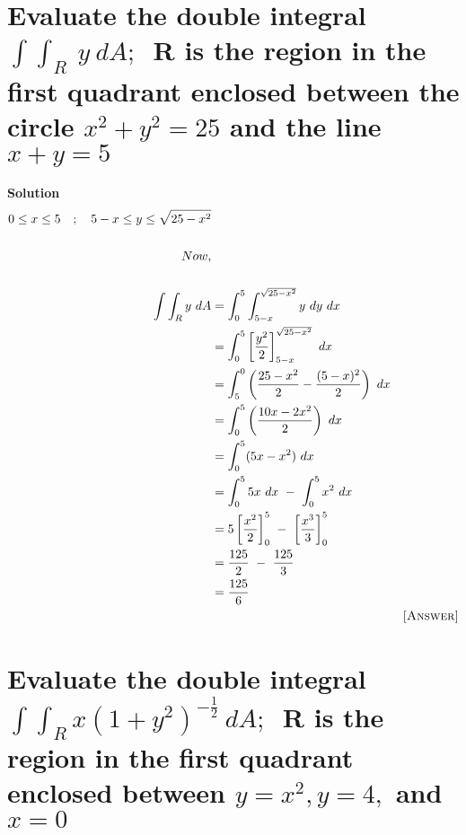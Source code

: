 \documentclass[12pt]{article}
\begin{document}
\section{Evaluate the double integral $\int\int_{R}\ y\ dA;$\ R is the region in the first quadrant enclosed between the circle $x^2+y^2=25$ and the line $x+y=5$}




\textbf{Solution}
\begin{align*}
    0\leq x\leq5\quad ;\quad 5-x\leq y\leq\sqrt{25-x^2}\\\\
    Now,\\\\
    \int\int_{R}y\ dA &=\int_{0}^{5}\int_{5-x}^{\sqrt{25-x^2}}y\ dy\ dx\\
    &=\int_{0}^{5}\left[\frac{y^2}{2}\right]_{5-x}^{\sqrt{25-x^2}}\ dx\\
    &=\int_{5}^{0}\left(\frac{25-x^2}{2}-\frac{(5-x)^2}{2}\right)\ dx\\
    &=\int_{0}^{5}\left(\frac{10x-2x^2}{2}\right)\ dx\\
    &=\int_{0}^{5}(5x-x^2)\ dx\\
    &=\int_{0}^{5}5x\ dx\ -\ \int_{0}^{5}x^2\ dx\\
    &=5\left[\frac{x^2}{2}\right]_{0}^{5}\ -\ \left[\frac{x^3}{3}\right]_{0}^{5}\\
    &=\frac{125}{2}\ -\ \frac{125}{3}\\
    &=\frac{125}{6}\\
     & & \textsc{[Answer]}
\end{align*}
\pagebreak


\section{Evaluate the double integral $\int\int_{R}x(1+y^2)^{-\frac{1}{2}}\ dA;$\ R is the region in the first quadrant enclosed between $y=x^2, y=4,$ and $x=0$}


\end{document}
